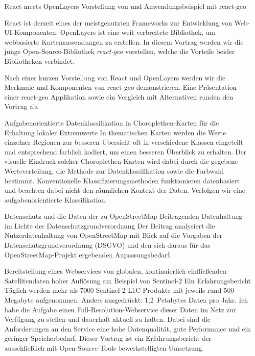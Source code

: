 %
{React meets OpenLayers}%
{Vorstellung von und Anwendungsbeispiel mit react-geo}%
{%
React ist derzeit eines der meistgenutzten Frameworks zur Entwicklung von
Web-UI-Komponenten. OpenLayers ist eine weit verbreitete Bibliothek, um
webbasierte Kartenanwendungen zu erstellen. In diesem Vortrag werden wir die
junge Open-Source-Bibliothek \emph{react-geo} vorstellen, welche die Vorteile beider
Bibliotheken verbindet.

Nach einer kurzen Vorstellung von React und OpenLayers werden wir die Merkmale
und Komponenten von react-geo demonstrieren. Eine Präsentation einer react-geo
Applikation sowie ein Vergleich mit Alternativen runden den Vortrag ab.%
}

%
{Aufgabenorientierte Datenklassi\-fikation in Choroplethen-Karten für die Erhaltung lokaler Extremwerte}%
{}%
{%
In thematischen Karten werden die Werte einzelner Regionen zur besseren
Übersicht oft in verschiedene Klassen eingeteilt und entsprechend farblich
kodiert, um einen besseren Überblick zu erhalten. Der visuelle Eindruck solcher
Choroplethen-Karten wird dabei durch die gegebene Werteverteilung, die Methode
zur Datenklassifikation sowie die Farbwahl bestimmt. Konventionelle
Klassifizierungsmethoden funktionieren datenbasiert und beachten dabei nicht
den räumlichen Kontext der Daten. Verfolgen wir eine aufgabenorientierte
Klassifikation.%
}



%
{Datenschutz und die Daten der zu OpenStreetMap Beitragenden}%
{Datenhaltung im Lichte der \mbox{Datenschutzgrundverordnung}}%
{%
Der Beitrag analysiert die Nutzerdatenhaltung von OpenStreetMap mit Blick auf
die Vorgaben der Datenschutzgrundverordnung (DSGVO) und den sich daraus für das
OpenStreetMap-Projekt ergebenden Anpassungsbedarf.%
}

%
{Bereitstellung eines Webservices von globalen, kontinuierlich einfließenden Satellitendaten hoher Auflösung am Beispiel von Sentinel-2}%
{Ein Erfahrungsbericht}%
{%
Täglich werden mehr als 7000 Sentinel-2-L1C-Produkte mit jeweils rund 500
Megabyte aufgenommen. Anders ausgedrückt: 1,2~Petabytes Daten pro Jahr. Ich
habe die Aufgabe einen Full-Resolution-Webservice dieser Daten im Netz zur
Verfügung zu stellen und dauerhaft aktuell zu halten. Dabei sind die
Anforderungen an den Service eine hohe Datenqualität, gute Performance und ein
geringer Speicherbedarf. Dieser Vortrag ist ein Erfahrungsbericht der
ausschließlich mit Open-Source-Tools bewerkstelligten Umsetzung.%
}


